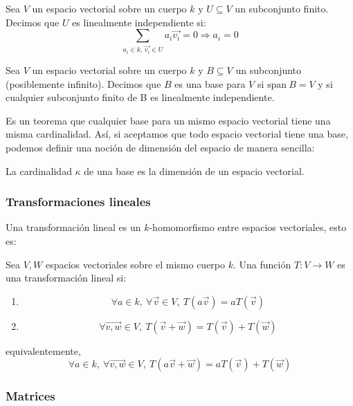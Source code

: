 \documentclass[10pt]{article}
\newcommand{\spn}{\mathrm{span}\:}
\begin{document}
\begin{definition}
  Sea $ V $ un espacio vectorial sobre un cuerpo $ k $ y $ U \subseteq V $ un subconjunto finito. Decimos que $ U $ es linealmente independiente si:
  \[ \sum_{a_i \in k,\, \vec{v_i} \in U} a_i \vec{v_i} = 0 \Rightarrow a_i = 0 \]
\end{definition}

\begin{definition}[Base]
  Sea $ V $ un espacio vectorial sobre un cuerpo $ k $ y $ B \subseteq V $ un subconjunto (posiblemente infinito). Decimos que $ B $ es una base para $ V $ si $ \spn B = V $
  y si cualquier subconjunto finito de B es linealmente independiente.
\end{definition}

Es un teorema que cualquier base para un mismo espacio vectorial tiene una misma cardinalidad. Así, si aceptamos que todo espacio vectorial tiene una base, podemos definir una noción
de dimensión del espacio de manera sencilla:

\begin{definition}[Dimensión]
  La cardinalidad $ \kappa $ de una base es la dimensión de un espacio vectorial.
\end{definition}

\subsubsection{Transformaciones lineales}

Una transformación lineal es un $ k $-homomorfismo entre espacios vectoriales, esto es:

\begin{definition}
  Sea $ V, W $ espacios vectoriales sobre el mismo cuerpo $ k $. Una función $ T : V \to W $ es una transformación lineal si:
  \begin{enumerate}
    \item \[ \forall a \in k,\ \forall \vec{v} \in V,\ T(a\vec{v}) =  aT(\vec{v}) \]
    \item \[ \forall \vec{v, w} \in V,\ T(\vec{v} + \vec{w}) = T(\vec{v}) + T(\vec{w}) \]
  \end{enumerate}
  equivalentemente,
  \[ \forall a \in k,\ \forall \vec{v, w} \in V,\ T(a\vec{v} + \vec{w}) = aT(\vec{v}) + T(\vec{w}) \]
\end{definition}

\subsubsection{Matrices}
\end{document}
